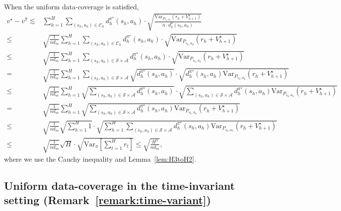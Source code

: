When the uniform data-coverage is satisfied,
\begin{align*}
	v^\star-v^{\widehat{\pi}}\lesssim&\sum_{h=1}^H\sum_{(s_h,a_h)\in\mathcal{C}_h}d^{\pi^\star}_h(s_h,a_h)\cdot\sqrt{\frac{\mathrm{Var}_{P_{s_h,a_h}}(r_h+V^\star_{h+1})}{ n\cdot d^\mu_h{(s_h,a_h)}}}\\
	\leq &\sqrt{\frac{1}{n d_m}}\sum_{h=1}^H\sum_{(s_h,a_h)\in\mathcal{C}_h}d^{\pi^\star}_h(s_h,a_h)\cdot\sqrt{{\mathrm{Var}_{P_{s_h,a_h}}(r_h+V^\star_{h+1})}}\\
	\leq &\sqrt{\frac{1}{n d_m}}\sum_{h=1}^H\sum_{(s_h,a_h)\in\mathcal{S}\times\mathcal{A}}d^{\pi^\star}_h(s_h,a_h)\cdot\sqrt{{\mathrm{Var}_{P_{s_h,a_h}}(r_h+V^\star_{h+1})}}\\
	= &\sqrt{\frac{1}{n d_m}}\sum_{h=1}^H\sum_{(s_h,a_h)\in\mathcal{S}\times\mathcal{A}}\sqrt{d^{\pi^\star}_h(s_h,a_h)}\cdot\sqrt{{d^{\pi^\star}_h(s_h,a_h)\mathrm{Var}_{P_{s_h,a_h}}(r_h+V^\star_{h+1})}}\\
	\leq &\sqrt{\frac{1}{n d_m}}\sum_{h=1}^H\sqrt{\sum_{(s_h,a_h)\in\mathcal{S}\times\mathcal{A}}d^{\pi^\star}_h(s_h,a_h)}\cdot\sqrt{\sum_{(s_h,a_h)\in\mathcal{S}\times\mathcal{A}}{d^{\pi^\star}_h(s_h,a_h)\mathrm{Var}_{P_{s_h,a_h}}(r_h+V^\star_{h+1})}}\\
	= &\sqrt{\frac{1}{n d_m}}\sum_{h=1}^H\sqrt{\sum_{(s_h,a_h)\in\mathcal{S}\times\mathcal{A}}{d^{\pi^\star}_h(s_h,a_h)\mathrm{Var}_{P_{s_h,a_h}}(r_h+V^\star_{h+1})}}\\
	\leq &\sqrt{\frac{1}{n d_m}}\sqrt{\sum_{h=1}^H 1}\cdot\sqrt{\sum_{h=1}^H\sum_{(s_h,a_h)\in\mathcal{S}\times\mathcal{A}}{d^{\pi^\star}_h(s_h,a_h)\mathrm{Var}_{P_{s_h,a_h}}(r_h+V^\star_{h+1})}}\\
	\leq &\sqrt{\frac{1}{n d_m}} \sqrt{H}\cdot\sqrt{\mathrm{Var}_{\pi}\left[\sum_{t=1}^{H} r_{t}\right]}\leq \sqrt{\frac{H^3}{n d_m}}, 
\end{align*}
where we use the Cauchy inequality and Lemma~\ref{lem:H3toH2}.

\subsection{Uniform data-coverage in the time-invariant setting (Remark~\ref{remark:time-variant})}

